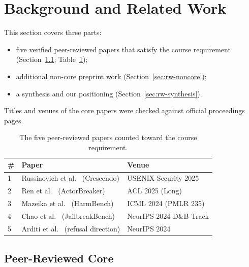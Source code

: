 \documentclass[sigconf,nonacm]{acmart}
\begin{document}
\section{Background and Related Work}
\label{sec:related}

This section covers three parts:
\begin{itemize}
  \item five verified peer-reviewed papers that satisfy the course requirement (Section~\ref{sec:rw-core}; Table~\ref{tab:core});
  \item additional non-core preprint work (Section~\ref{sec:rw-noncore});
  \item a synthesis and our positioning (Section~\ref{sec:rw-synthesis}).
\end{itemize}
Titles and venues of the core papers were checked against official proceedings pages.

\begin{table}[t]
  \caption{The five peer-reviewed papers counted toward the course requirement.}
  \label{tab:core}
  \small
  \begin{tabular}{p{0.3cm}p{4.0cm}p{2.7cm}}
    \toprule
    \textbf{\#} & \textbf{Paper} & \textbf{Venue} \\
    \midrule
    1 & Russinovich et al.~\cite{russinovich2025crescendo} (Crescendo) & USENIX Security 2025 \\
    2 & Ren et al.~\cite{ren2025llms} (ActorBreaker) & ACL 2025 (Long) \\
    3 & Mazeika et al.~\cite{mazeika2024harmbench} (HarmBench) & ICML 2024 (PMLR 235) \\
    4 & Chao et al.~\cite{chao2024jailbreakbench} (JailbreakBench) & NeurIPS 2024 D\&B Track \\
    5 & Arditi et al.~\cite{arditi2024refusal} (refusal direction) & NeurIPS 2024 \\
    \bottomrule
  \end{tabular}
\end{table}

\subsection{Peer-Reviewed Core}
\label{sec:rw-core}
\end{document}
